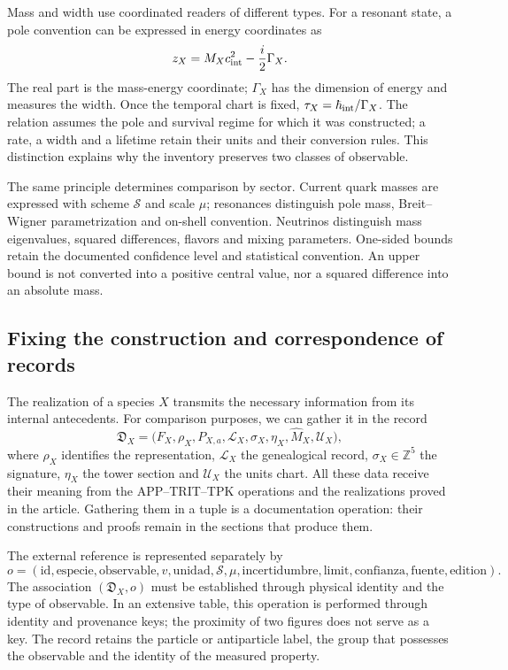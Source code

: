 Mass and width use coordinated readers of different types. For a
resonant state, a pole convention can be expressed in energy
coordinates as
\[
 z_X=M_Xc_{\rm int}^{2}-\frac{i}{2}\Gamma_X.
\]
The real part is the mass-energy coordinate; \(\Gamma_X\) has
the dimension of energy and measures the width. Once the temporal chart is fixed,
\(\tau_X=\hbar_{\rm int}/\Gamma_X\). The relation assumes the pole and
survival regime for which it was constructed; a rate, a width and
a lifetime retain their units and their conversion rules. This
distinction explains why the inventory preserves two classes of observable.

The same principle determines comparison by sector. Current quark masses
are expressed with scheme \(\mathscr S\) and scale \(\mu\);
resonances distinguish pole mass, Breit--Wigner parametrization and
on-shell convention. Neutrinos distinguish mass eigenvalues,
squared differences, flavors and mixing parameters. One-sided
bounds retain the documented confidence level and statistical
convention. An upper bound is not converted into a positive central value,
nor a squared difference into an absolute mass.

\subsection{Fixing the construction and correspondence of records}
\label{vi:subsec:vi-congelacion}

The realization of a species \(X\) transmits the necessary information
from its internal antecedents. For comparison purposes, we can gather it
in the record
\[
 \mathfrak D_X=
 \bigl(F_X,\rho_X,P_{X,a},\mathcal L_X,
       \sigma_X,\eta_X,\widehat M_X,\mathcal U_X\bigr),
\]
where \(\rho_X\) identifies the representation, \(\mathcal L_X\) the
genealogical record, \(\sigma_X\in\mathbb Z^5\) the signature,
\(\eta_X\) the tower section and \(\mathcal U_X\) the units
chart. All these data receive their meaning from the
APP--TRIT--TPK operations and the realizations proved in the article. Gathering them
in a tuple is a documentation operation: their constructions and
proofs remain in the sections that produce them.

The external reference is represented separately by
\[
 o=(\mathrm{id},\mathrm{especie},\mathrm{observable},
      v,\mathrm{unidad},\mathscr S,\mu,
      \mathrm{incertidumbre},\text{limit},\mathrm{confianza},
      \mathrm{fuente},\text{edition}).
\]
The association \((\mathfrak D_X,o)\) must be established through
physical identity and the type of observable. In an extensive table, this
operation is performed through identity and provenance keys; the proximity
of two figures does not serve as a key. The record retains the
particle or antiparticle label, the group that possesses the observable and
the identity of the measured property.

